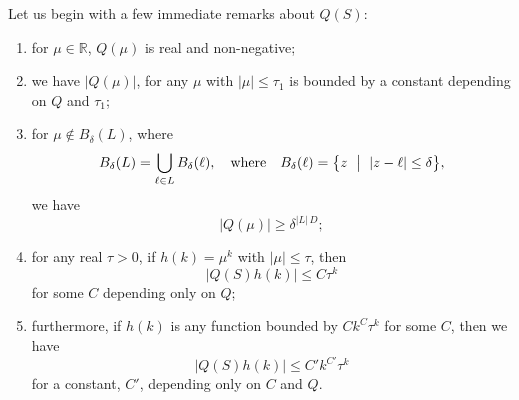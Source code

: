 \documentclass{memo-l}
\theoremstyle{plain}
\theoremstyle{definition}
\numberwithin{section}{chapter}
\numberwithin{equation}{chapter}
\theoremstyle{plain}
\theoremstyle{definition}
\newcommand\RR{\mathbb{R}}
\begin{document}
Let us begin with a few immediate remarks about \( Q(S) \):
\begin{enumerate} \item for \( \mu\in\RR \), \( Q(\mu) \) is real and
non-negative; \item we have \( |Q(\mu)| \), for any \( \mu \) with \(
|\mu|\le\tau_1 \) is bounded by a constant depending on \( Q \) and \(
\tau_1 \); \item for \( \mu\notin B_\delta(L) \), where
$$
B_\delta(L) = \bigcup_{\ell\in L} B_\delta(\ell), \quad\mbox{where}
\quad
B_\delta(\ell)=\bigl\{z \ \bigm|\ |z-\ell|\le \delta\bigr\},
$$
we have \[ |Q(\mu)| \geq
\delta^{|L|\,D}; \] \item for any real \( \tau>0 \), if \( h(k)=\mu^k \)
with \( |\mu|\leq \tau \), then \[ |Q(S)h(k)| \leq C\tau^k \] for some \( C
\) depending only on \( Q \); \item furthermore, if \( h(k) \) is any
function bounded by \( Ck^C \tau^k \) for some \( C \), then we have \[
|Q(S)h(k)| \leq C'k^{C'} \tau^k  \] for a constant, \( C' \), depending
only on \( C \) and \( Q \).  \end{enumerate}
\end{document}
